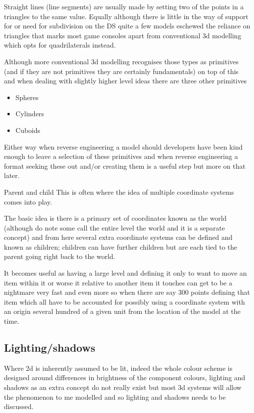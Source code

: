 \documentclass[
]{book}
\providecommand{\tightlist}{%
  \setlength{\itemsep}{0pt}\setlength{\parskip}{0pt}}
\begin{document}
Straight lines (line segments) are usually made by setting two of the points in a triangles to the same value. Equally although there is little in the way of support for or need for subdivision on the DS quite a few models eschewed the reliance on triangles that marks most game consoles apart from conventional 3d modelling which opts for quadrilaterals instead.

Although more conventional 3d modelling recognises those types as primitives (and if they are not primitives they are certainly fundamentals) on top of this and when dealing with slightly higher level ideas there are three other primitives

\begin{itemize}
\tightlist
\item
  Spheres
\item
  Cylinders
\item
  Cuboids
\end{itemize}

Either way when reverse engineering a model should developers have been kind enough to leave a selection of these primitives and when reverse engineering a format seeking these out and/or creating them is a useful step but more on that later.

Parent and child This is often where the idea of multiple coordinate systems comes into play.

The basic idea is there is a primary set of coordinates known as the world (although do note some call the entire level the world and it is a separate concept) and from here several extra coordinate systems can be defined and known as children; children can have further children but are each tied to the parent going right back to the world.

It becomes useful as having a large level and defining it only to want to move an item within it or worse it relative to another item it touches can get to be a nightmare very fast and even more so when there are say 300 points defining that item which all have to be accounted for possibly using a coordinate system with an origin several hundred of a given unit from the location of the model at the time.

\hypertarget{lightingshadows}{%
\subsection{Lighting/shadows}\label{lightingshadows}}

Where 2d is inherently assumed to be lit, indeed the whole colour scheme is designed around differences in brightness of the component colours, lighting and shadows as an extra concept do not really exist but most 3d systems will allow the phenomenon to me modelled and so lighting and shadows needs to be discussed.
\end{document}
